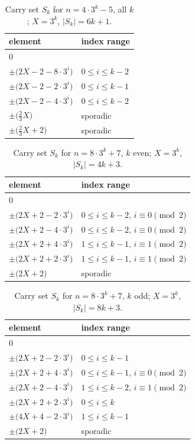 \begin{table}[htbp]\centering\small
\caption{Carry set $S_k$ for $n=4\cdot 3^k - 5$, all $k$; $X=3^k$, $|S_k|=6k+1$.}
\label{tab:4m50}
\begin{tabular}{ll}\toprule
element & index range \\ \midrule
$0$ & \\
$\pm\bigl(2X - 2 - 8\cdot 3^i\bigr)$ & $0\le i\le k-2$ \\
$\pm\bigl(2X - 2 - 2\cdot 3^i\bigr)$ & $0\le i\le k-1$ \\
$\pm\bigl(2X - 2 - 4\cdot 3^i\bigr)$ & $0\le i\le k-2$ \\
$\pm\bigl(\tfrac{2}{3}X\bigr)$ & sporadic \\
$\pm\bigl(\tfrac{2}{3}X + 2\bigr)$ & sporadic \\
\bottomrule\end{tabular}\end{table}

\begin{table}[htbp]\centering\small
\caption{Carry set $S_k$ for $n=8\cdot 3^k + 7$, $k$ even; $X=3^k$, $|S_k|=4k+3$.}
\label{tab:8p70}
\begin{tabular}{ll}\toprule
element & index range \\ \midrule
$0$ & \\
$\pm\bigl(2X + 2 - 2\cdot 3^i\bigr)$ & $0\le i\le k-2$, $i\equiv 0\pmod 2$ \\
$\pm\bigl(2X + 2 - 4\cdot 3^i\bigr)$ & $0\le i\le k-2$, $i\equiv 0\pmod 2$ \\
$\pm\bigl(2X + 2 + 4\cdot 3^i\bigr)$ & $1\le i\le k-1$, $i\equiv 1\pmod 2$ \\
$\pm\bigl(2X + 2 + 2\cdot 3^i\bigr)$ & $1\le i\le k-1$, $i\equiv 1\pmod 2$ \\
$\pm\bigl(2X + 2\bigr)$ & sporadic \\
\bottomrule\end{tabular}\end{table}

\begin{table}[htbp]\centering\small
\caption{Carry set $S_k$ for $n=8\cdot 3^k + 7$, $k$ odd; $X=3^k$, $|S_k|=8k+3$.}
\label{tab:8p71}
\begin{tabular}{ll}\toprule
element & index range \\ \midrule
$0$ & \\
$\pm\bigl(2X + 2 - 2\cdot 3^i\bigr)$ & $0\le i\le k-1$ \\
$\pm\bigl(2X + 2 + 4\cdot 3^i\bigr)$ & $0\le i\le k-1$, $i\equiv 0\pmod 2$ \\
$\pm\bigl(2X + 2 - 4\cdot 3^i\bigr)$ & $1\le i\le k-2$, $i\equiv 1\pmod 2$ \\
$\pm\bigl(2X + 2 + 2\cdot 3^i\bigr)$ & $0\le i\le k$ \\
$\pm\bigl(4X + 4 - 2\cdot 3^i\bigr)$ & $1\le i\le k-1$ \\
$\pm\bigl(2X + 2\bigr)$ & sporadic \\
\bottomrule\end{tabular}\end{table}

